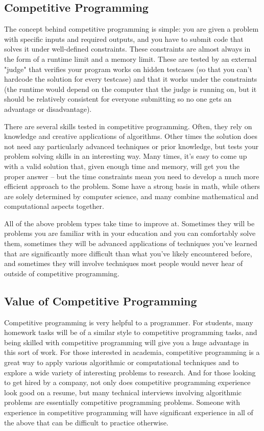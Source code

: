 \subsection{Competitive Programming}

The concept behind competitive programming is simple: you are given a problem with specific inputs and required outputs, and you have to submit code that solves it under well-defined constraints. These constraints are almost always in the form of a runtime limit and a memory limit. These are tested by an external "judge" that verifies your program works on hidden testcases (so that you can't hardcode the solution for every testcase) and that it works under the constraints (the runtime would depend on the computer that the judge is running on, but it should be relatively consistent for everyone submitting so no one gets an advantage or disadvantage).

There are several skills tested in competitive programming. Often, they rely on knowledge and creative applications of algorithms. Other times the solution does not need any particularly advanced techniques or prior knowledge, but tests your problem solving skills in an interesting way. Many times, it's easy to come up with a valid solution that, given enough time and memory, will get you the proper answer -- but the time constraints mean you need to develop a much more efficient approach to the problem. Some have a strong basis in math, while others are solely determined by computer science, and many combine mathematical and computational aspects together.

All of the above problem types take time to improve at. Sometimes they will be problems you are familiar with in your education and you can comfortably solve them, sometimes they will be advanced applications of techniques you've learned that are significantly more difficult than what you've likely encountered before, and sometimes they will involve techniques most people would never hear of outside of competitive programming.

\subsection{Value of Competitive Programming}

Competitive programming is very helpful to a programmer. For students, many homework tasks will be of a similar style to competitive programming tasks, and being skilled with competitive programming will give you a huge advantage in this sort of work. For those interested in academia, competitive programming is a great way to apply various algorithmic or computational techniques and to explore a wide variety of interesting problems to research. And for those looking to get hired by a company, not only does competitive programming experience look good on a resume, but many technical interviews involving algorithmic problems are essentially competitive programming problems. Someone with experience in competitive programming will have significant experience in all of the above that can be difficult to practice otherwise.

